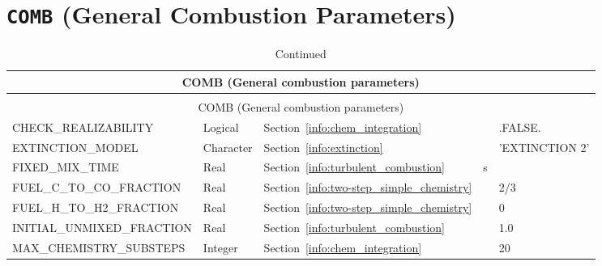\documentclass[11pt]{book}
\begin{document}
\vspace{\baselineskip}


\section{\texorpdfstring{{\tt COMB}}{COMB} (General Combustion Parameters)}

\begin{longtable}{@{\extracolsep{\fill}}|l|l|l|l|l|}
\caption[General combustion parameters ({\ct COMB} namelist group)]{For more information see Chapter~\ref{info:COMB}.}
\label{tbl:COMB} \\
\hline
\multicolumn{5}{|c|}{{\ct COMB} (General combustion parameters)} \\
\hline \hline
\endfirsthead
\caption[]{Continued} \\
\hline
\multicolumn{5}{|c|}{{\ct COMB} (General combustion parameters)} \\
\hline \hline
\endhead
{\ct CHECK\_REALIZABILITY}                      & Logical       & Section~\ref{info:chem_integration}                   &               & {\ct .FALSE.}        \\ \hline
{\ct EXTINCTION\_MODEL}                         & Character     & Section~\ref{info:extinction}                         &               & {\ct 'EXTINCTION 2'} \\ \hline
{\ct FIXED\_MIX\_TIME}                          & Real          & Section~\ref{info:turbulent_combustion}               &  s            &                      \\ \hline
{\ct FUEL\_C\_TO\_CO\_FRACTION}                 & Real          & Section~\ref{info:two-step_simple_chemistry}          &               &  2/3                 \\ \hline
{\ct FUEL\_H\_TO\_H2\_FRACTION}                 & Real          & Section~\ref{info:two-step_simple_chemistry}          &               &  0                   \\ \hline
{\ct INITIAL\_UNMIXED\_FRACTION}                & Real          & Section~\ref{info:turbulent_combustion}               &               & 1.0                  \\ \hline
{\ct MAX\_CHEMISTRY\_SUBSTEPS}                  & Integer       & Section~\ref{info:chem_integration}                   &               & 20                   \\ \hline

\end{longtable}
\end{document}
